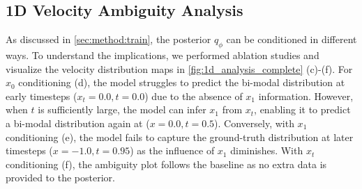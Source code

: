 \subsection{1D Velocity Ambiguity Analysis}
\label{app:full_1d_analysis}
As discussed in \cref{sec:method:train}, the posterior \(q_\phi\) can be conditioned in different ways. To understand the implications, we performed ablation studies and visualize the velocity distribution maps in \cref{fig:1d_analysis_complete} (c)-(f). For \(x_0\) conditioning (d), the model struggles to predict the bi-modal distribution at early timesteps (\(x_t=0.0, t=0.0\)) due to the absence of \(x_1\) information. However, when \(t\) is sufficiently large, the model can infer \(x_1\) from \(x_t\), enabling it to predict a bi-modal distribution again at (\(x=0.0, t=0.5\)). Conversely, with \(x_1\) conditioning (e), the model fails to capture the ground-truth distribution at later timesteps (\(x=-1.0, t=0.95\)) as the influence of \(x_1\) diminishes. With \(x_t\) conditioning (f), the ambiguity plot follows the baseline as no extra data is provided to the posterior. 


